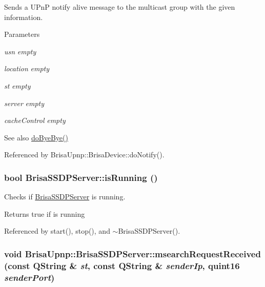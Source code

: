 Sends a UPnP notify alive message to the multicast group with the given information. 
\begin{DoxyParams}{Parameters}
\item[{\em usn}]{\itshape empty\/} \item[{\em location}]{\itshape empty\/} \item[{\em st}]{\itshape empty\/} \item[{\em server}]{\itshape empty\/} \item[{\em cacheControl}]{\itshape empty\/} \end{DoxyParams}
\begin{DoxySeeAlso}{See also}
\hyperlink{classBrisaUpnp_1_1BrisaSSDPServer_afe21b672caca021dbed29b7e0e7a9744}{doByeBye()} 
\end{DoxySeeAlso}


Referenced by BrisaUpnp::BrisaDevice::doNotify().\hypertarget{classBrisaUpnp_1_1BrisaSSDPServer_ac6e15aabc0f27fbea5214b6eb134abc6}{
\subsubsection[{isRunning}]{\setlength{\rightskip}{0pt plus 5cm}bool BrisaSSDPServer::isRunning ()}}
\label{classBrisaUpnp_1_1BrisaSSDPServer_ac6e15aabc0f27fbea5214b6eb134abc6}


Checks if \hyperlink{classBrisaUpnp_1_1BrisaSSDPServer}{BrisaSSDPServer} is running. \begin{DoxyReturn}{Returns}
true if is running 
\end{DoxyReturn}


Referenced by start(), stop(), and $\sim$BrisaSSDPServer().\hypertarget{classBrisaUpnp_1_1BrisaSSDPServer_a81aff8b072c5fe63f1b3011c5084866a}{
\subsubsection[{msearchRequestReceived}]{\setlength{\rightskip}{0pt plus 5cm}void BrisaUpnp::BrisaSSDPServer::msearchRequestReceived (const QString \& {\em st}, \/  const QString \& {\em senderIp}, \/  quint16 {\em senderPort})}}
\label{classBrisaUpnp_1_1BrisaSSDPServer_a81aff8b072c5fe63f1b3011c5084866a}


